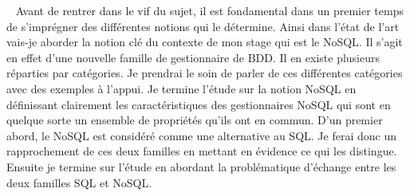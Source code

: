 ~\vfill
Avant de rentrer dans le vif du sujet, il est fondamental dans un
premier temps de s'imprégner des différentes notions qui le détermine.
Ainsi dans l'état de l'art vais-je aborder la notion clé du contexte de
mon stage qui est le \textsf{NoSQL}. Il s'agit en effet d'une nouvelle
famille de gestionnaire de \textsf{BDD}. Il en existe plusieurs réparties 
par catégories. Je prendrai le soin de parler de ces différentes
catégories avec des exemples à l'appui. 
Je termine l'étude sur la notion \textsf{NoSQL} en définissant clairement les
caractéristiques des gestionnaires \textsf{NoSQL} qui sont en quelque
sorte un ensemble de propriétés qu'ils ont en commun. D'un premier
abord, le \textsf{NoSQL} est considéré comme une alternative
au \textsf{SQL}. Je ferai donc un rapprochement de ces deux
familles en mettant en évidence ce qui les distingue. Ensuite je termine
sur l'étude en abordant la problématique d'échange entre 
les deux familles
\textsf{SQL} et \textsf{NoSQL}.
\vfill

